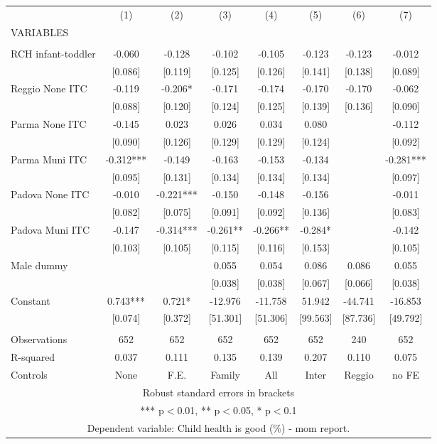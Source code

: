 \begin{tabular}{lccccccc} \hline
 & (1) & (2) & (3) & (4) & (5) & (6) & (7) \\
VARIABLES &  &  &  &  &  &  &  \\ \hline
 &  &  &  &  &  &  &  \\
RCH infant-toddler & -0.060 & -0.128 & -0.102 & -0.105 & -0.123 & -0.123 & -0.012 \\
 & [0.086] & [0.119] & [0.125] & [0.126] & [0.141] & [0.138] & [0.089] \\
Reggio None ITC & -0.119 & -0.206* & -0.171 & -0.174 & -0.170 & -0.170 & -0.062 \\
 & [0.088] & [0.120] & [0.124] & [0.125] & [0.139] & [0.136] & [0.090] \\
Parma None ITC & -0.145 & 0.023 & 0.026 & 0.034 & 0.080 &  & -0.112 \\
 & [0.090] & [0.126] & [0.129] & [0.129] & [0.124] &  & [0.092] \\
Parma Muni ITC & -0.312*** & -0.149 & -0.163 & -0.153 & -0.134 &  & -0.281*** \\
 & [0.095] & [0.131] & [0.134] & [0.134] & [0.134] &  & [0.097] \\
Padova None ITC & -0.010 & -0.221*** & -0.150 & -0.148 & -0.156 &  & -0.011 \\
 & [0.082] & [0.075] & [0.091] & [0.092] & [0.136] &  & [0.083] \\
Padova Muni ITC & -0.147 & -0.314*** & -0.261** & -0.266** & -0.284* &  & -0.142 \\
 & [0.103] & [0.105] & [0.115] & [0.116] & [0.153] &  & [0.105] \\
Male dummy &  &  & 0.055 & 0.054 & 0.086 & 0.086 & 0.055 \\
 &  &  & [0.038] & [0.038] & [0.067] & [0.066] & [0.038] \\
Constant & 0.743*** & 0.721* & -12.976 & -11.758 & 51.942 & -44.741 & -16.853 \\
 & [0.074] & [0.372] & [51.301] & [51.306] & [99.563] & [87.736] & [49.792] \\
 &  &  &  &  &  &  &  \\
Observations & 652 & 652 & 652 & 652 & 652 & 240 & 652 \\
R-squared & 0.037 & 0.111 & 0.135 & 0.139 & 0.207 & 0.110 & 0.075 \\
 Controls & None & F.E. & Family & All & Inter & Reggio & no FE \\ \hline
\multicolumn{8}{c}{ Robust standard errors in brackets} \\
\multicolumn{8}{c}{ *** p$<$0.01, ** p$<$0.05, * p$<$0.1} \\
\multicolumn{8}{c}{ Dependent variable: Child health is good (\%) - mom report.} \\
\end{tabular}
